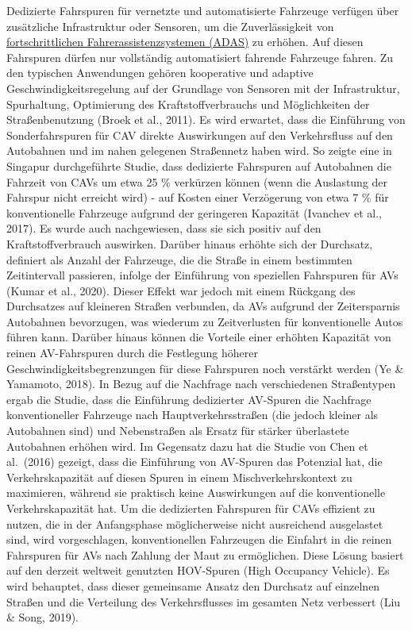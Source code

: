 \documentclass[
]{book}
\begin{document}
Dedizierte Fahrspuren für vernetzte und automatisierte Fahrzeuge verfügen über zusätzliche Infrastruktur oder Sensoren, um die Zuverlässigkeit von \protect\hyperlink{adas}{fortschrittlichen Fahrerassistenzsystemen (ADAS)} zu erhöhen. Auf diesen Fahrspuren dürfen nur vollständig automatisiert fahrende Fahrzeuge fahren. Zu den typischen Anwendungen gehören kooperative und adaptive Geschwindigkeitsregelung auf der Grundlage von Sensoren mit der Infrastruktur, Spurhaltung, Optimierung des Kraftstoffverbrauchs und Möglichkeiten der Straßenbenutzung (Broek et al., 2011). Es wird erwartet, dass die Einführung von Sonderfahrspuren für CAV direkte Auswirkungen auf den Verkehrsfluss auf den Autobahnen und im nahen gelegenen Straßennetz haben wird. So zeigte eine in Singapur durchgeführte Studie, dass dedizierte Fahrspuren auf Autobahnen die Fahrzeit von CAVs um etwa 25 \% verkürzen können (wenn die Auslastung der Fahrspur nicht erreicht wird) - auf Kosten einer Verzögerung von etwa 7 \% für konventionelle Fahrzeuge aufgrund der geringeren Kapazität (Ivanchev et al., 2017). Es wurde auch nachgewiesen, dass sie sich positiv auf den Kraftstoffverbrauch auswirken.
Darüber hinaus erhöhte sich der Durchsatz, definiert als Anzahl der Fahrzeuge, die die Straße in einem bestimmten Zeitintervall passieren, infolge der Einführung von speziellen Fahrspuren für AVs (Kumar et al., 2020). Dieser Effekt war jedoch mit einem Rückgang des Durchsatzes auf kleineren Straßen verbunden, da AVs aufgrund der Zeitersparnis Autobahnen bevorzugen, was wiederum zu Zeitverlusten für konventionelle Autos führen kann. Darüber hinaus können die Vorteile einer erhöhten Kapazität von reinen AV-Fahrspuren durch die Festlegung höherer Geschwindigkeitsbegrenzungen für diese Fahrspuren noch verstärkt werden (Ye \& Yamamoto, 2018). In Bezug auf die Nachfrage nach verschiedenen Straßentypen ergab die Studie, dass die Einführung dedizierter AV-Spuren die Nachfrage konventioneller Fahrzeuge nach Hauptverkehrsstraßen (die jedoch kleiner als Autobahnen sind) und Nebenstraßen als Ersatz für stärker überlastete Autobahnen erhöhen wird.
Im Gegensatz dazu hat die Studie von Chen et al.~(2016) gezeigt, dass die Einführung von AV-Spuren das Potenzial hat, die Verkehrskapazität auf diesen Spuren in einem Mischverkehrskontext zu maximieren, während sie praktisch keine Auswirkungen auf die konventionelle Verkehrskapazität hat. Um die dedizierten Fahrspuren für CAVs effizient zu nutzen, die in der Anfangsphase möglicherweise nicht ausreichend ausgelastet sind, wird vorgeschlagen, konventionellen Fahrzeugen die Einfahrt in die reinen Fahrspuren für AVs nach Zahlung der Maut zu ermöglichen. Diese Lösung basiert auf den derzeit weltweit genutzten HOV-Spuren (High Occupancy Vehicle). Es wird behauptet, dass dieser gemeinsame Ansatz den Durchsatz auf einzelnen Straßen und die Verteilung des Verkehrsflusses im gesamten Netz verbessert (Liu \& Song, 2019).
\end{document}
